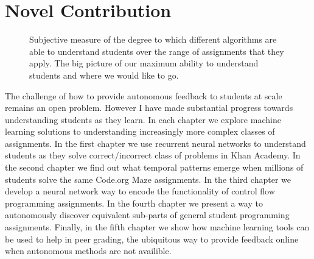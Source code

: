 \section{Novel Contribution}

\begin{figure}[h]
\center
{}

\caption[Subjective contribution overview]{
 Subjective measure of the degree to which different algorithms are able to understand students over the range of assignments that they apply. 
 The big picture of our maximum ability to understand students and where we would like to go.
\label{fig:bigPicture}
}

\end{figure}

The challenge of how to provide autonomous feedback to students at scale remains an open problem. However I have made substantial progress towards understanding students as they learn. In each chapter we explore machine learning solutions to understanding increasingly more complex classes of assignments. 
In the first chapter we use recurrent neural networks to understand students as they solve correct/incorrect class of problems in Khan Academy. In the second chapter we find out what temporal patterns emerge when millions of students solve the same Code.org Maze assignments. In the third chapter we develop a neural network way to encode the functionality of control flow programming assignments. In the fourth chapter we present a way to autonomously discover equivalent sub-parts of general student programming assignments. Finally, in the fifth chapter we show how machine learning tools can be used to help in peer grading, the ubiquitous way to provide feedback online when autonomous methods are not availible.

